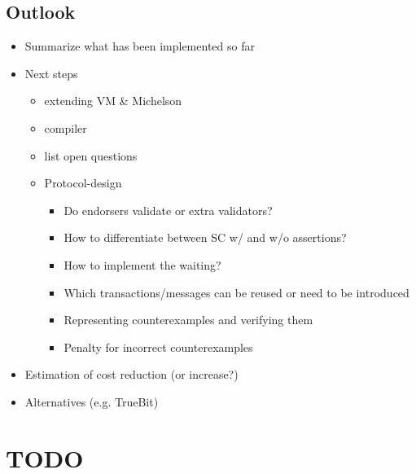 
\subsection{Outlook}

\draft{}
\begin{itemize}
\item Summarize what has been implemented so far
\item Next steps
	\begin{itemize}
	\item extending VM \& Michelson
	\item compiler
	\item list open questions
	\item Protocol-design
		\begin{itemize}
		\item Do endorsers validate or extra validators?
		\item How to differentiate between SC w/ and w/o assertions?
		\item How to implement the waiting?
		\item Which transactions/messages can be reused or need to be introduced
		\item Representing counterexamples and verifying them
		\item Penalty for incorrect counterexamples
		\end{itemize}
	\end{itemize}
\item Estimation of cost reduction (or increase?)
\item Alternatives (e.g. TrueBit)
\end{itemize}


\section{TODO}
